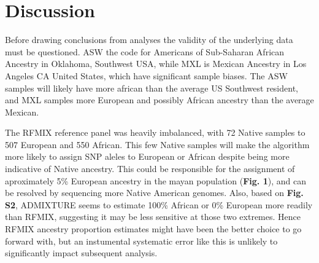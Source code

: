 \documentclass[11pt]{article}
\begin{document}
\section{Discussion}





Before drawing conclusions from analyses the validity of the underlying data must be questioned. ASW the code for Americans of Sub-Saharan African Ancestry in Oklahoma, Southwest USA, while MXL is Mexican Ancestry in Los Angeles CA United States, which have significant sample biases. The ASW samples will likely have more african than the average US Southwest resident, and MXL samples more European and possibly African ancestry than the average Mexican.

The RFMIX reference panel was heavily imbalanced, with 72 Native samples to 507 European and 550 African. This few Native samples will make the algorithm more likely to assign SNP aleles to European or African despite being more indicative of Native ancestry. This could be responsible for the assignment of aproximately 5\% European ancestry in the mayan population (\textbf{Fig. 1}), and can be resolved by sequencing more Native American genomes. Also, based on \textbf{Fig. S2}, ADMIXTURE seems to estimate 100\% African or 0\% European more readily than RFMIX, suggesting it may be less sensitive at those two extremes. Hence RFMIX ancestry proportion estimates might have been the better choice to go forward with, but an instumental systematic error like this is unlikely to significantly impact subsequent analysis.
\end{document}
